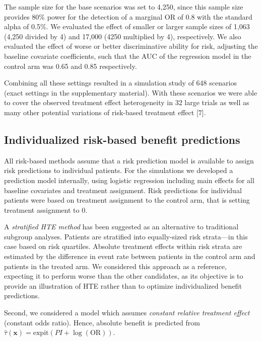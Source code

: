 \documentclass[]{elsarticle} %
\begin{document}
The sample size for the base scenarios was set to 4,250, since this
sample size provides \(80\%\) power for the detection of a marginal OR
of 0.8 with the standard alpha of 0.5\%. We evaluated the effect of
smaller or larger sample sizes of 1,063 (4,250 divided by 4) and 17,000
(4250 multiplied by 4), respectively. We also evaluated the effect of
worse or better discriminative ability for risk, adjusting the baseline
covariate coefficients, such that the AUC of the regression model in the
control arm was 0.65 and 0.85 respectively.

Combining all these settings resulted in a simulation study of 648
scenarios (exact settings in the supplementary material). With these
scenarios we were able to cover the observed treatment effect
heterogeneity in 32 large trials as well as many other potential
variations of risk-based treatment effect {[}7{]}.

\hypertarget{individualized-risk-based-benefit-predictions}{%
\subsection{Individualized risk-based benefit
predictions}\label{individualized-risk-based-benefit-predictions}}

All risk-based methods assume that a risk prediction model is available
to assign risk predictions to individual patients. For the simulations
we developed a prediction model internally, using logistic regression
including main effects for all baseline covariates and treatment
assignment. Risk predictions for individual patients were based on
treatment assignment to the control arm, that is setting treatment
assignment to 0.

A \emph{stratified HTE method} has been suggested as an alternative to
traditional subgroup analyses. Patients are stratified into
equally-sized risk strata---in this case based on risk quartiles.
Absolute treatment effects within risk strata are estimated by the
difference in event rate between patients in the control arm and
patients in the treated arm. We considered this approach as a reference,
expecting it to perform worse than the other candidates, as its
objective is to provide an illustration of HTE rather than to optimize
individualized benefit predictions.

Second, we considered a model which assumes \emph{constant relative
treatment effect} (constant odds ratio). Hence, absolute benefit is
predicted from
\(\hat{\tau}(\bm{x}) = \text{expit}(PI +\log(\text{OR}))\).
\end{document}
